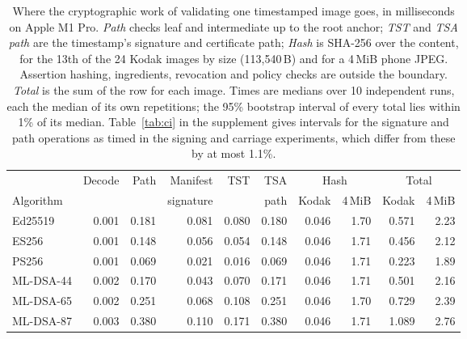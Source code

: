 \begin{table}[t]
\caption{Where the cryptographic work of validating one timestamped image goes, in milliseconds on Apple M1 Pro. \emph{Path} checks leaf and intermediate up to the root anchor; \emph{TST} and \emph{TSA path} are the timestamp's signature and certificate path; \emph{Hash} is SHA-256 over the content, for the 13th of the 24 Kodak images by size (113,540\,B) and for a 4\,MiB phone JPEG. Assertion hashing, ingredients, revocation and policy checks are outside the boundary. \emph{Total} is the sum of the row for each image. Times are medians over 10 independent runs, each the median of its own repetitions; the 95\% bootstrap interval of every total lies within 1\% of its median. Table~\ref{tab:ci} in the supplement gives intervals for the signature and path operations as timed in the signing and carriage experiments, which differ from these by at most 1.1\%.}
\label{tab:verify}
\small
\setlength{\tabcolsep}{4pt}
\begin{tabular}{lrrrrrrrrr}
\toprule
 & Decode & Path & Manifest & TST & TSA & \multicolumn{2}{c}{Hash} & \multicolumn{2}{c}{Total}\\
\cmidrule(lr){7-8}\cmidrule(lr){9-10}
Algorithm & & & signature & & path & Kodak & 4\,MiB & Kodak & 4\,MiB\\
\midrule
Ed25519 & 0.001 & 0.181 & 0.081 & 0.080 & 0.180 & 0.046 & 1.70 & 0.571 & 2.23\\
ES256 & 0.001 & 0.148 & 0.056 & 0.054 & 0.148 & 0.046 & 1.71 & 0.456 & 2.12\\
PS256 & 0.001 & 0.069 & 0.021 & 0.016 & 0.069 & 0.046 & 1.71 & 0.223 & 1.89\\
ML-DSA-44 & 0.002 & 0.170 & 0.043 & 0.070 & 0.171 & 0.046 & 1.71 & 0.501 & 2.16\\
ML-DSA-65 & 0.002 & 0.251 & 0.068 & 0.108 & 0.251 & 0.046 & 1.70 & 0.729 & 2.39\\
ML-DSA-87 & 0.003 & 0.380 & 0.110 & 0.171 & 0.380 & 0.046 & 1.71 & 1.089 & 2.76\\
\bottomrule
\end{tabular}
\end{table}
